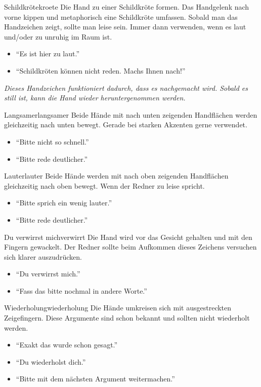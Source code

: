 \begin{handzeichen}[.2\linewidth]{Schildkröte}{kroete}
Die Hand zu einer Schildkröte formen. Das Handgelenk nach vorne kippen und metaphorisch eine Schildkröte umfassen. Sobald man das Handzeichen zeigt, sollte man leise sein.
Immer dann verwenden, wenn es laut und/oder zu unruhig im Raum ist.
\begin{itemize}
	\item \enquote{Es ist hier zu laut.}
	\item \enquote{Schildkröten können nicht reden. Machs Ihnen nach!}
\end{itemize}
\end{handzeichen}

\emph{
    Dieses Handzeichen funktioniert dadurch, dass es nachgemacht wird.
    Sobald es still ist, kann die Hand wieder heruntergenommen werden.
}

\begin{handzeichen}{Langsamer}{langsamer}
Beide Hände mit nach unten zeigenden Handflächen werden gleichzeitig nach unten bewegt. Gerade bei starken Akzenten gerne verwendet.
\begin{itemize}
	\item \enquote{Bitte nicht so schnell.}
	\item \enquote{Bitte rede deutlicher.}
\end{itemize}
\end{handzeichen}

\begin{handzeichen}{Lauter}{lauter}
Beide Hände werden mit nach oben zeigenden Handflächen gleichzeitig nach oben bewegt.
Wenn der Redner zu leise spricht.
\begin{itemize}
	\item \enquote{Bitte sprich ein wenig lauter.}
	\item \enquote{Bitte rede deutlicher.}
\end{itemize}
\end{handzeichen}

\begin{handzeichen}{Du verwirrst mich}{verwirrt}
Die Hand wird vor das Gesicht gehalten und mit den Fingern gewackelt. Der Redner sollte beim Aufkommen dieses Zeichens versuchen sich klarer auszudrücken.
\begin{itemize}
	\item \enquote{Du verwirrst mich.}
	\item \enquote{Fass das bitte nochmal in andere Worte.}
\end{itemize}
\end{handzeichen}

\begin{handzeichen}{Wiederholung}{wiederholung}
Die Hände umkreisen sich mit ausgestreckten Zeigefingern. 
Diese Argumente sind schon bekannt und sollten nicht wiederholt werden.
\begin{itemize}
	\item \enquote{Exakt das wurde schon gesagt.}
	\item \enquote{Du wiederholst dich.}
	\item \enquote{Bitte mit dem nächsten Argument weitermachen.}
\end{itemize}
\end{handzeichen}
